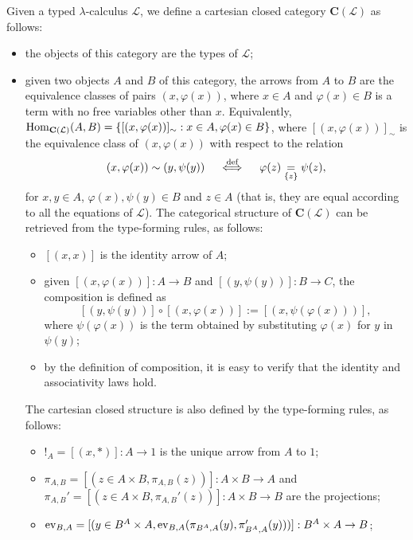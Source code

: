 \begin{definition}\label{idx:syntactic-category}
    Given a typed $\lambda$-calculus $\mathcal L$, we define a cartesian closed category $\mathbf C(\mathcal L)$ as follows:
    \begin{itemize}
        \item the objects of this category are the types of $\mathcal L$;
        \item given two objects $A$ and $B$ of this category, the arrows from $A$ to $B$ are the equivalence classes of pairs $(x, \varphi(x))$, where $x \in A$ and  $\varphi(x) \in B$ is a term with no free variables other than $x$.
        Equivalently, $\operatorname{Hom}_{\mathbf C(\mathcal L)}(A,B) = \{[(x,\varphi(x))]_\sim : x \in A, \varphi(x) \in B\}$, where $[(x,\varphi(x))]_\sim$ is the equivalence class of $(x,\varphi(x))$ with respect to the relation
        \[ (x,\varphi(x)) \sim (y,\psi(y)) \quad\overset{\textnormal{def}}{\iff}\quad \varphi(z) \underset{\{z\}}{=} \psi(z), \]
        for $x,y \in A$, $\varphi(x),\psi(y) \in B$ and $z \in A$ (that is, they are equal according to all the equations of $\mathcal L$). The categorical structure of $\mathbf C(\mathcal L)$ can be retrieved from the type-forming rules, as follows:
        \begin{itemize}[label=$*$]
            \item $[(x,x)]$ is the identity arrow of $A$;
            \item given $[(x,\varphi(x))] : A \to B$ and $[(y,\psi(y))] : B \to C$, the composition is defined as
            \[ [(y,\psi(y))] \circ [(x,\varphi(x))]  := [(x,\psi(\varphi(x)))], \]
            where $\psi(\varphi(x))$ is the term obtained by substituting $\varphi(x)$ for $y$ in $\psi(y)$;
            \item by the definition of composition, it is easy to verify that the identity and associativity laws hold.
        \end{itemize}
        The cartesian closed structure is also defined by the type-forming rules, as follows:
        \begin{itemize}[label=$*$]
            \item $!_A = [(x,*)] : A \to 1$ is the unique arrow from $A$ to $1$;
            \item $\pi_{A,B} = [(z \in A \times B,\pi_{A,B}(z))] : A \times B \to A$ and $\pi_{A,B}' = [(z \in A \times B,\pi_{A,B}'(z))] : A \times B \to B$ are the projections;
            \item $\operatorname{ev}_{B,A} = [(y \in B^A \times A,\operatorname{ev}_{B,A}(\pi_{B^A,A}(y),\pi_{B^A,A}'(y)))] : B^A \times A \to B$;

\end{itemize}
\end{itemize}
\end{definition}
